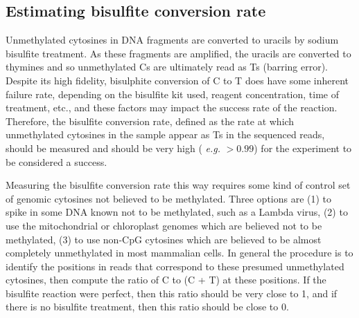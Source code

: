 \documentclass[10pt]{article}
\begin{document}
\subsection{Estimating bisulfite conversion rate}
\label{sec:estim-busilf-conv}

Unmethylated cytosines in DNA fragments are converted to uracils by
sodium bisulfite treatment. As these fragments are amplified, the
uracils are converted to thymines and so unmethylated Cs are
ultimately read as Ts (barring error). Despite its high fidelity,
bisulphite conversion of C to T does have some inherent failure rate,
depending on the bisulfite kit used, reagent concentration, time of
treatment, etc., and these factors may impact the success rate of the
reaction. Therefore, the bisulfite conversion rate, defined as the
rate at which unmethylated cytosines in the sample appear as Ts in the
sequenced reads, should be measured and should be very high ({\em
  e.g.} $>0.99$) for the experiment to be considered a success.

Measuring the bisulfite conversion rate this way requires some kind of
control set of genomic cytosines not believed to be methylated. Three
options are (1) to spike in some DNA known not to be methylated, such
as a Lambda virus, (2) to use the mitochondrial or chloroplast genomes
which are believed not to be methylated, (3) to use non-CpG cytosines
which are believed to be almost completely unmethylated in most
mammalian cells. In general the procedure is to identify the positions
in reads that correspond to these presumed unmethylated cytosines,
then compute the ratio of C to (C + T) at these positions. If the
bisulfite reaction were perfect, then this ratio should be very close
to 1, and if there is no bisulfite treatment, then this ratio should
be close to 0.
\end{document}

